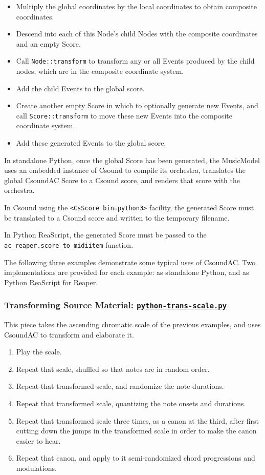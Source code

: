 \documentclass[letterpaper,10pt,DIV=12,parskip=half]{scrartcl}
\begin{document}
\begin{itemize}
\item Multiply the global coordinates by the local coordinates to obtain composite coordinates.
\item Descend into each of this Node's child Nodes with the composite coordinates and an empty Score.
\item Call \lstinline|Node::transform| to transform any or all Events produced by the child nodes, which are in the composite coordinate system.
\item Add the child Events to the global score.
\item Create another empty Score in which to optionally generate new Events, and call \lstinline|Score::transform| to move these new Events into the composite coordinate system.
\item Add these generated Events to the global score.
\end{itemize}

In standalone Python, once the global Score has been generated, the MusicModel uses an embedded instance of Csound to compile its orchestra, translates the global CsoundAC Score to a Csound score, and renders that score with the orchestra.

In Csound using the \lstinline|<CsScore bin=python3>| facility, the generated Score must be translated to a Csound score and written to the temporary filename.

In Python ReaScript, the generated Score must be passed to the \lstinline|ac_reaper.score_to_midiitem| function.

The following three examples demonstrate some typical uses of CsoundAC. Two implementations are provided for each example: as standalone Python, and as Python ReaScript for Reaper.

\subsubsection{Transforming Source Material: \href{https://github.com/gogins/csound-ac/blob/master/user-guide/python-trans-scale.py}{\lstinline|python-trans-scale.py|}}

This piece takes the ascending chromatic scale of the previous examples, and uses CsoundAC to transform and elaborate it. 

\begin{enumerate}
\item Play the scale.
\item Repeat that scale, shuffled so that notes are in random order.
\item Repeat that transformed scale, and randomize the note durations.
\item Repeat that transformed scale, quantizing the note onsets and durations.
\item Repeat that transformed scale three times, as a canon at the third, after first cutting down the jumps in the transformed scale in order to make the canon easier to hear.
\item Repeat that canon, and apply to it semi-randomized chord progressions and modulations.
\end{enumerate}
\end{document}
